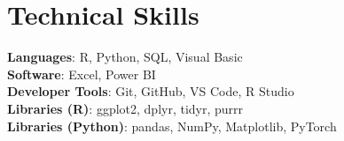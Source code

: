 \documentclass[letterpaper,11pt]{article}
\begin{document}
%
\section{Technical Skills}
 \begin{itemize}[leftmargin=0.15in, label={}]
    \small{\item{
     \textbf{Languages}{: R, Python, SQL, Visual Basic} \\
     \textbf{Software}{: Excel, Power BI} \\
     \textbf{Developer Tools}{: Git, GitHub, VS Code, R Studio} \\
     \textbf{Libraries (R)}{: ggplot2, dplyr, tidyr, purrr} \\
     \textbf{Libraries (Python)}{: pandas, NumPy, Matplotlib, PyTorch}
    }}
 \end{itemize}


\end{document}
